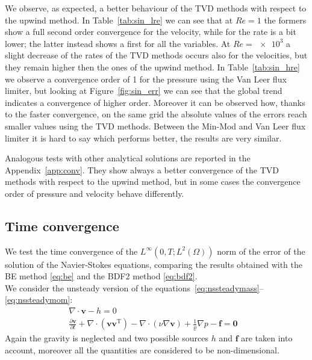 We observe, as expected, a better behaviour of the TVD methods with respect to 
the upwind method. In Table~\ref{tab:sin_lre} we can see that at $Re=1$ the 
formers show a full second order convergence for the velocity, while for the 
rate is a bit lower; the latter instead shows a first for all the variables. At 
$Re=\num{e3}$ a slight decrease of the rates of the TVD methods occurs also for 
the velocities, but they remain higher then the ones of the upwind method. In 
Table~\ref{tab:sin_hre} we observe a convergence order of 1 for the pressure 
using the Van Leer flux limiter, but looking at Figure~\ref{fig:sin_err} we can 
see that the global trend indicates a convergence of higher order. Moreover it 
can be observed how, thanks to the faster convergence, on the same grid the 
absolute values of the errors reach smaller values using the TVD methods. 
Between the Min-Mod and Van Leer flux limiter it is hard to say which performs 
better, the results are very similar.

Analogous tests with other analytical solutions are reported in the 
Appendix~\ref{app:conv}. They show always a better convergence of the TVD 
methods with respect to the upwind method, but in some cases the convergence 
order of pressure and velocity behave differently.
%
\subsection{Time convergence}
We test the time convergence of the $L^\infty(0,T;L^2(\Omega))$ norm of the 
error of the solution of the Navier-Stokes equations, comparing the results 
obtained with the BE method \eqref{eq:be} and the BDF2 method \eqref{eq:bdf2}.\\
We consider the unsteady version of the 
equations~\eqref{eq:nssteadymass}--\eqref{eq:nssteadymom}:
\begin{align}
	\label{eq:nsunsteadymass} \nabla \cdot \mathbf{v} -h = 0&\\
	\label{eq:nsunsteadymom} \frac{\partial \mathbf{v}}{\partial t} +\nabla 
	\cdot (\mathbf{v} \mathbf{v}^\mathrm{T}) - 
	\nabla \cdot (\nu \nabla \mathbf{v}) + \frac{1}{\varrho}\nabla p  
	-\mathbf{f} = \mathbf{0}&
\end{align}
Again the gravity is neglected and two possible sources $h$ and $\mathbf{f}$ 
are taken into account, moreover all the quantities are considered to be 
non-dimensional.
%
